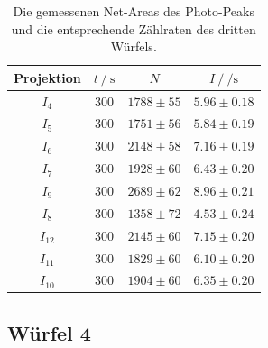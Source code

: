 \begin{table}[H]
  \centering
  \begin{tabular}{c c c c}
    \toprule
    Projektion &  $t \:/\: \si{\second}$ &     $N$ &           $I \:/\: \si{\per\second}$ \\
    \midrule
             $I_{ 4}$ &   $300$ & $1788 \pm   55$ & $5.96\pm0.18$ \\
             $I_{ 5}$ &   $300$ & $1751 \pm   56$ & $5.84\pm0.19$ \\
             $I_{ 6}$ &   $300$ & $2148 \pm   58$ & $7.16\pm0.19$ \\
             $I_{ 7}$ &   $300$ & $1928 \pm   60$ & $6.43\pm0.20$ \\
             $I_{ 9}$ &   $300$ & $2689 \pm   62$ & $8.96\pm0.21$ \\
             $I_{ 8}$ &   $300$ & $1358 \pm   72$ & $4.53\pm0.24$ \\
             $I_{12}$ &   $300$ & $2145 \pm   60$ & $7.15\pm0.20$ \\
             $I_{11}$ &   $300$ & $1829 \pm   60$ & $6.10\pm0.20$ \\
             $I_{10}$ &   $300$ & $1904 \pm   60$ & $6.35\pm0.20$ \\
    \bottomrule
  \end{tabular}
  \caption{Die gemessenen Net-Areas des Photo-Peaks und die entsprechende Zählraten des dritten Würfels. }
  \label{tab:w3}
\end{table}

\subsection{Würfel 4}


